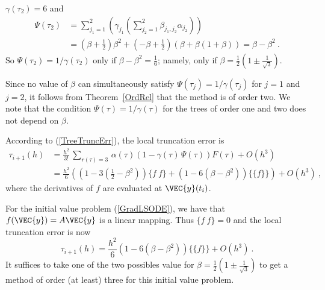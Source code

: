 {{\begin{enumerate}
$\gamma(\tau_2) = 6$ and
\begin{align*}
\Psi(\tau_2) &= \sum_{j_1=1}^2 \left( \gamma_{j_1}
 \left( \sum_{j_2=1}^2 \beta_{j_1,j_2} \alpha_{j_2}\right)\right) \\
&= \left(\beta + \frac{1}{2}\right)\beta^2
+ \left(-\beta + \frac{1}{2}\right)\left( \beta +\beta (1+\beta) \right)
= \beta - \beta^2 \ .
\end{align*}
So $\Psi(\tau_2) = 1/\gamma(\tau_2)$ only if
$\displaystyle \beta - \beta^2 = \frac{1}{6}$; namely, only if
$\displaystyle \beta = \frac{1}{2} \left(1 \pm \frac{1}{\sqrt{3}}\right)$.
\end{enumerate}
}

Since no value of $\beta$ can simultaneously satisfy
$\Psi(\tau_j) = 1/\gamma(\tau_j)$ for $j=1$ and $j=2$, it follows from
Theorem~\ref{OrdRel} that the method is of order two.   We note that
the condition $\Psi(\tau) = 1/\gamma(\tau)$ for the trees of order one
and two does not depend on $\beta$.

 According to (\ref{TreeTruncErr}), the local truncation error
is
\begin{align*}
\tau_{i+1}(h) &= \frac{h^2}{3!}\,\sum_{r(\tau)=3}\,\alpha(\tau) \left( 1
  -\gamma(\tau)\,\Psi(\tau) \right)F(\tau) + O(h^3) \\
& = \frac{h^2}{6} \left( \left( 1 - 3 \left(\frac{1}{2} - \beta^2\right)\right)
\{ f\ f\} + \left(1  - 6 (\beta - \beta^2)\right)\{\{f\}\}\right) +O(h^3) \ ,
\end{align*}
where the derivatives of $f$ are evaluated at $\VEC{y}(t_i)$.

 For the initial value problem (\ref{GradLSODE}), we have that
$f(\VEC{y}) = A\VEC{y}$ is a linear mapping.  Thus $\{f \ f\} = 0$ and
the local truncation error is now
\[
  \tau_{i+1}(h) = \frac{h^2}{6}
  \left(1  - 6 (\beta - \beta^2)\right)\{\{f\}\} +O(h^3) \ .
\]
It suffices to take one of the two possibles value for
$\displaystyle \beta = \frac{1}{2} \left(1 \pm \frac{1}{\sqrt{3}}\right)$
to get a method of order (at least) three for this initial value problem.

}
